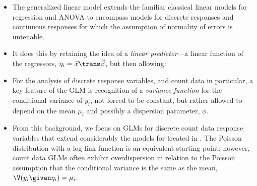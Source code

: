 \begin{itemize}

  \item The generalized linear model extends the familiar classical linear models for regression and ANOVA to encompass
  models for discrete responses and continuous responses for which the assumption of normality of errors is untenable.

  \item It does this by retaining the idea of a \emph{linear
      predictor}---a linear function of the regressors,
  $\eta_i = \vec{x}\trans \vec{\beta}$, but then allowing:

  \item For the analysis of discrete response variables, and count data in particular, a key feature
  of the GLM is recognition of a \emph{variance function} for the conditional variance of
  $y_i$, not forced to be constant, but rather allowed to depend on the mean $\mu_i$ and
  possibly a dispersion parameter, $\phi$.

  \item From this background, we focus on GLMs for discrete count data response variables that extend considerably
  the \loglin models for \ctabs
  treated in .  The Poisson distribution with a log
  link function is an equivalent starting point; however, count data
  GLMs often exhibit overdispersion in relation to the Poisson assumption that the conditional variance
  is the same as the mean, $\V(y_i \given \eta_i) = \mu_i$.


\end{itemize}
